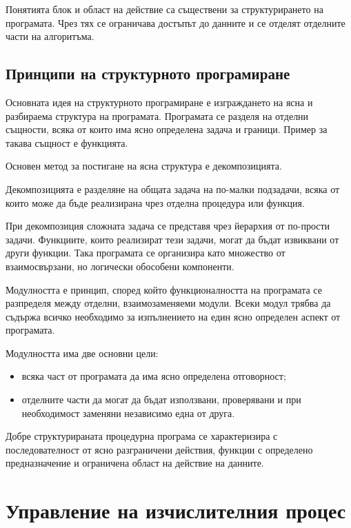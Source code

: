 Понятията блок и област на действие са съществени за структурирането на програмата. Чрез тях се ограничава достъпът до данните и се отделят отделните части на алгоритъма.

\subsection{Принципи на структурното програмиране}\label{s:14.1.1}

Основната идея на структурното програмиране е изграждането на ясна и разбираема структура на програмата. Програмата се разделя на отделни същности, всяка от които има ясно определена задача и граници. Пример за такава същност е функцията.

Основен метод за постигане на ясна структура е декомпозицията.

\begin{defn}[Декомпозиция]
Декомпозицията е разделяне на общата задача на по-малки подзадачи, всяка от които може да бъде реализирана чрез отделна процедура или функция.
\end{defn}

При декомпозиция сложната задача се представя чрез йерархия от по-прости задачи. Функциите, които реализират тези задачи, могат да бъдат извиквани от други функции. Така програмата се организира като множество от взаимосвързани, но логически обособени компоненти.

\begin{keydefn}[Модулност]
Модулността е принцип, според който функционалността на програмата се разпределя между отделни, взаимозаменяеми модули. Всеки модул трябва да съдържа всичко необходимо за изпълнението на един ясно определен аспект от програмата.
\end{keydefn}

Модулността има две основни цели:

\begin{itemize}
\item всяка част от програмата да има ясно определена отговорност;
\item отделните части да могат да бъдат използвани, проверявани и при необходимост заменяни независимо една от друга.
\end{itemize}

Добре структурираната процедурна програма се характеризира с последователност от ясно разграничени действия, функции с определено предназначение и ограничена област на действие на данните.

\section{Управление на изчислителния процес}\label{s:14.2}

